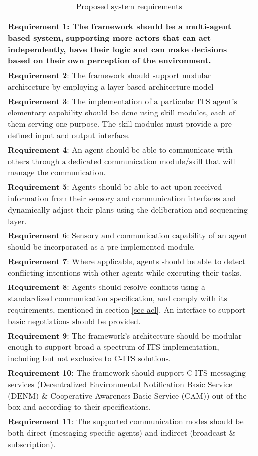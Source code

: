 \documentclass[0main.tex]{subfiles}
\begin{document}
\begin{table}[htbp]
    \small
    \caption{Proposed system requirements}
    \centering\begin{tabular}{>{\footnotesize}p{}}
        \toprule 
\textbf{Requirement 1}: The framework should be a multi-agent based system, supporting more actors 
that can act independently, have their logic and can make decisions based on their 
own perception of the environment.
\\ \midrule
\textbf{Requirement 2}: The framework should support modular architecture by employing a layer-based 
architecture model
\\ \midrule
\textbf{Requirement 3}: The implementation of a particular ITS agent's elementary
capability should be done using skill modules, each of them serving one purpose. The skill modules must provide a
pre-defined input and output interface.
\\ \midrule
\textbf{Requirement 4}: An agent should be able to communicate with others through a dedicated communication module/skill 
that will manage the communication.
\\ \midrule
\textbf{Requirement 5}: Agents should be able to act upon received information from their sensory and communication interfaces
and dynamically adjust their plans using the deliberation and sequencing layer.
\\ \midrule
\textbf{Requirement 6}: Sensory and communication capability of an agent should be incorporated 
as a pre-implemented module.
\\ \midrule
\textbf{Requirement 7}: Where applicable, agents should be able to detect conflicting intentions with other agents
while executing their tasks. 
\\ \midrule
\textbf{Requirement 8}: Agents should resolve conflicts using a standardized communication
specification, and comply with its requirements, mentioned in section \ref{sec-acl}. An
interface to support basic negotiations should be provided.
\\ \midrule
\textbf{Requirement 9}: The framework's architecture should be modular enough to support broad 
a spectrum of ITS implementation, including but not exclusive to C-ITS solutions.
\\ \midrule
\textbf{Requirement 10}: The framework should support C-ITS messaging services (Decentralized
Environmental Notification Basic Service (DENM) \& Cooperative Awareness Basic Service (CAM))
out-of-the-box and according to their specifications.
\\ \midrule
\textbf{Requirement 11}: The supported communication modes should be both direct (messaging specific agents) and indirect  
(broadcast \& subscription). 
\\ \bottomrule
    \end{tabular}
    \label{sys-requirements}
\end{table}

\clearpage
\end{document}
